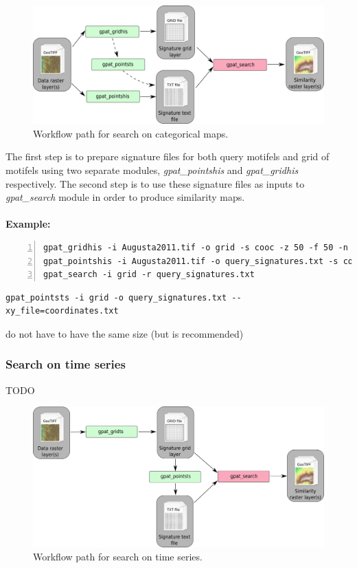 \documentclass[12pt,margin=0.5in]{article}
\begin{document}
\begin{figure}[h]
	\centering
	\includegraphics[width=\textwidth]{search_scheme.png}
	\caption{Workflow path for search on categorical maps.}
	\label{FIG:SEARCH}
\end{figure}

The first step is to prepare signature files for both query motifels and grid of motifels using two separate modules, {\it gpat\_pointshis} and {\it gpat\_gridhis} respectively. The second step is to use these signature files as inputs to {\it gpat\_search} module in order to produce similarity maps.\\\\
{\bf Example:}

\begin{lstlisting}[numbers=left]
gpat_gridhis -i Augusta2011.tif -o grid -s cooc -z 50 -f 50 -n pdf
gpat_pointshis -i Augusta2011.tif -o query_signatures.txt -s cooc -z 50 -n pdf --xy_file=coordinates.txt
gpat_search -i grid -r query_signatures.txt
\end{lstlisting}

\vspace{5pt}

\vspace{5pt}

\begin{lstlisting}
gpat_pointsts -i grid -o query_signatures.txt --xy_file=coordinates.txt
\end{lstlisting}

do not have to have the same size (but is recommended)

\FloatBarrier

\subsubsection{Search on time series}
TODO
\begin{figure}[h]
	\centering
	\includegraphics[width=\textwidth]{searchts_scheme.png}
	\caption{Workflow path for search on time series.}
	\label{FIG:SEARCHTS}
\end{figure}
\end{document}
